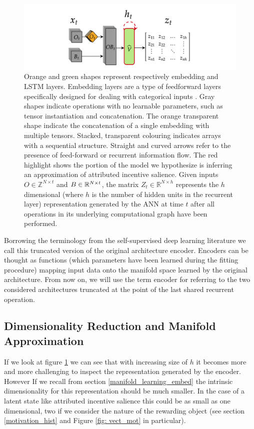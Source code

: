 \begin{figure}[h]
  \centering
  \includegraphics[width=\textwidth]{images/chapter_4/representation_extractor.png}
    \caption[\textbf{The procedure for generating latent representations generated by an ANN}]{Orange and green shapes represent respectively embedding and LSTM layers. Embedding layers are a type of feedforward layers specifically designed for dealing with categorical inputs \cite{chollet2015keras}. Gray shapes indicate operations with no learnable parameters, such as tensor instantiation and concatenation. The orange transparent shape indicate the concatenation of a single embedding with multiple tensors. Stacked, transparent colouring indicates arrays with a sequential structure. Straight and curved arrows refer to the presence of feed-forward or recurrent information flow. The red highlight shows the portion of the model we hypothesize is inferring an approximation of attributed incentive salience. Given inputs $O \in \mathbb{Z}^{N \times t}$ and $B \in \mathbb{R}^{N \times t \time 5}$, the matrix $Z_t \in \mathbb{R}^{N \times h}$ represents the $h$ dimensional (where $h$ is the number of hidden units in the recurrent layer) representation generated by the ANN at time $t$ after all operations in its underlying computational graph have been performed.}
    \label{fig: repr_extr}
\end{figure}

Borrowing the terminology from the self-supervised deep learning literature \cite{bengio2017deep} we call this truncated version of the original architecture encoder. Encoders can be thought as functions (which parameters have been learned during the fitting procedure) mapping input data onto the manifold space learned by the original architecture. From now on, we will use the term encoder for referring to the two considered architectures truncated at the point of the last shared recurrent operation.

\subsection{Dimensionality Reduction and Manifold Approximation}
\label{dim_reduction}
If we look at figure \ref{fig: repr_extr} we can see that with increasing size of $h$ it becomes more and more challenging to inspect the representation generated by the encoder. However If we recall from section \ref{manifold_learning_embed} the intrinsic dimensionality for this representation should be much smaller. In the case of a latent state like attributed incentive salience this could be as small as one dimensional, two if we consider the nature of the rewarding object (see section \ref{motivation_hist} and Figure \ref{fig: vect_mot} in particular). 

